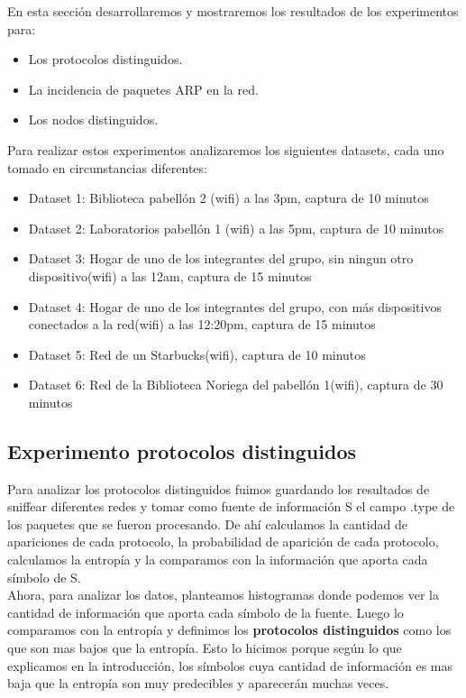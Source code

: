 En esta sección desarrollaremos y mostraremos los resultados de los experimentos para:

\begin{itemize}
\item Los protocolos distinguidos.
\item La incidencia de paquetes ARP en la red.
\item Los nodos distinguidos.
\end{itemize}

Para realizar estos experimentos analizaremos los siguientes datasets, cada uno tomado en circunstancias diferentes:

\begin{itemize}
\item Dataset 1: Biblioteca pabellón 2 (wifi) a las 3pm, captura de 10 minutos
\item Dataset 2: Laboratorios pabellón 1 (wifi) a las 5pm, captura de 10 minutos
\item Dataset 3: Hogar de uno de los integrantes del grupo, sin ningun otro dispositivo(wifi) a las 12am, captura de 15 minutos
\item Dataset 4: Hogar de uno de los integrantes del grupo, con más dispositivos conectados a la red(wifi) a las 12:20pm, captura de 15 minutos
\item Dataset 5: Red de un Starbucks(wifi), captura de 10 minutos
\item Dataset 6: Red de la Biblioteca Noriega del pabellón 1(wifi), captura de 30 minutos
\end{itemize}


\subsection{Experimento protocolos distinguidos}

Para analizar los protocolos distinguidos fuimos guardando los resultados de sniffear diferentes redes y tomar como fuente de información S el campo .type de los paquetes que se fueron procesando. De ahí calculamos la cantidad de apariciones de cada protocolo, la probabilidad de aparición de cada protocolo, calculamos la entropía y la comparamos con la información que aporta cada símbolo de S.\\

Ahora, para analizar los datos, planteamos histogramas donde podemos ver la cantidad de información que aporta cada símbolo de la fuente. Luego lo comparamos con la entropía y definimos los \textbf{protocolos distinguidos} como los que son mas bajos que la entropía. Esto lo hicimos porque según lo que explicamos en la introducción, los símbolos cuya cantidad de información es mas baja que la entropía son muy predecibles y aparecerán muchas veces. \\


